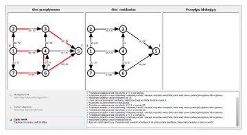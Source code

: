 \begin{appendices}
\begin{figure}
\begin{subfigure}{\textwidth}
 		\end{subfigure}
 		\begin{subfigure}{\textwidth}
 			\includegraphics[width=0.9\linewidth]{./img/mkm12.jpg}
 		\end{subfigure}
 	\end{figure}
\end{appendices}